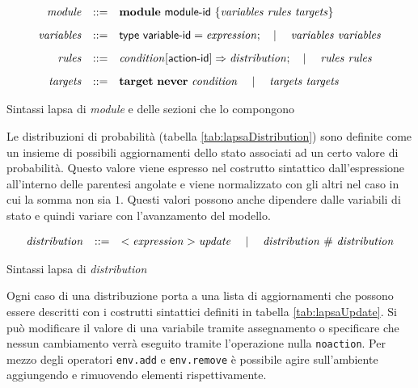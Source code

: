 \begin{table}[htbp!] %
$$
\begin{array}{rcl}
	\mathit{module} &::=& \mathbf{module} \mbox{ } {\sf module}\textrm{-}{\sf id} \mbox{ } \{ \mathit{variables} \mbox{ } \mathit{rules} \mbox{ } \mathit{targets} \}
		\\[.3cm]
	\mathit{variables} &::=& {\sf type} \mbox{ } {\sf variable}\textrm{-}{\sf id} = \mathit{expression}; \quad\mid\quad \mathit{variables} \mbox{ } \mathit{variables}
		\\[.3cm]
	\mathit{rules} &::=& \mathit{condition} [ {\sf action}\textrm{-}{\sf id}] \Rightarrow \mathit{distribution}; \quad\mid\quad \mathit{rules} \mbox{ } \mathit{rules}
		\\[.3cm]
	\mathit{targets} &::=& \mathbf{target} \mbox{ } \mathbf{never} \mbox{ } \mathit{condition} \quad\mid\quad \mathit{targets} \mbox{ } \mathit{targets} \\
\end{array}
$$
\caption{Sintassi \ac{lapsa} di \emph{module} e delle sezioni che lo compongono}
\label{tab:lapsaModule}
\end{table}

Le distribuzioni di probabilità (tabella \ref{tab:lapsaDistribution}) sono definite come un insieme di possibili aggiornamenti dello stato associati ad un certo valore di probabilità. Questo valore viene espresso nel costrutto sintattico dall'espressione all'interno delle parentesi angolate e viene normalizzato con gli altri nel caso in cui la somma non sia $1$. Questi valori possono anche dipendere dalle variabili di stato e quindi variare con l'avanzamento del modello.

\begin{table}[htbp!] %
$$
\begin{array}{rcl}
	\mathit{distribution} &::=& <\mathit{expression}> \mathit{update} \quad\mid\quad \mathit{distribution} \mbox{ } \# \mbox{ } \mathit{distribution} \\
\end{array}
$$
\caption{Sintassi \ac{lapsa} di \emph{distribution}}
\label{tab:lapsaDistribution}
\end{table}

Ogni caso di una distribuzione porta a una lista di aggiornamenti che possono essere descritti con i costrutti sintattici definiti in tabella \ref{tab:lapsaUpdate}. Si può modificare il valore di una variabile tramite assegnamento o specificare che nessun cambiamento verrà eseguito tramite l'operazione nulla \texttt{noaction}. Per mezzo degli operatori \texttt{env.add} e \texttt{env.remove} è possibile agire sull'ambiente aggiungendo e rimuovendo elementi rispettivamente.

